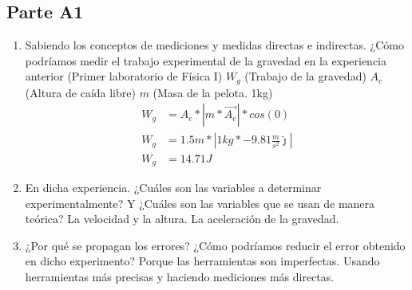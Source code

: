 \subsection{Parte A1}%
\label{sub:cues_parte_a1}

\begin{enumerate}
	\item Sabiendo los conceptos de mediciones y medidas directas e indirectas.
		¿Cómo podríamos medir el trabajo experimental de la gravedad en la experiencia anterior
		(Primer laboratorio de Física I)\newline
		$W_g$ (Trabajo de la gravedad)\newline
		$A_c$ (Altura de caída libre)\newline
		$m$ (Masa de la pelota. 1kg)
		\begin{align*}
			W_g &= A_c * |m*\vec{A_e}| * cos(0)\\
			W_g &= 1.5m*|1kg*-9.81 \frac{m}{s^2} \widehat{\jmath}| \\
			W_g &= 14.71 J
		\end{align*}
	\item En dicha experiencia. ¿Cuáles son las variables a determinar experimentalmente?
		Y ¿Cuáles son las variables que se usan de manera teórica?
		\subitem La velocidad y la altura.
		\subitem La aceleración de la gravedad.
	\item ¿Por qué se propagan los errores?
		¿Cómo podríamos reducir el error obtenido en dicho experimento?
		\subitem Porque las herramientas son imperfectas.
		\subitem Usando herramientas más precisas y haciendo mediciones más directas.
\end{enumerate}
